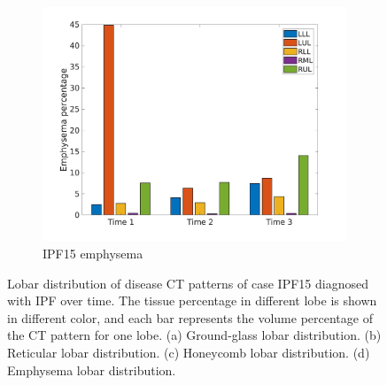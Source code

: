 \begin{figure}[H]
\begin{subfigure}{.46\linewidth}
  \includegraphics[width=\linewidth,trim={{.0\wd0} {.0\wd0} {.0\wd0} {.0\wd0}},clip]{Appendix/Image_AppexA/LobarDistribution/IPF15EmphysemaLobarRegionDiseaseDistributionOverTime.jpg}
  \caption{IPF15 emphysema}
  \label{fig:IPF15LobarRegionDiseaseDistributionOverTime-d}
\end{subfigure}
\caption{Lobar distribution of disease CT patterns of case IPF15 diagnosed with IPF over time. The tissue percentage in different lobe is shown in different color, and each bar represents the volume percentage of the CT pattern for one lobe. (a) Ground-glass lobar distribution. (b) Reticular lobar distribution. (c) Honeycomb lobar distribution. (d) Emphysema lobar distribution.}
\label{fig:IPF15LobarRegionDiseaseDistributionOverTime}
\end{figure}


